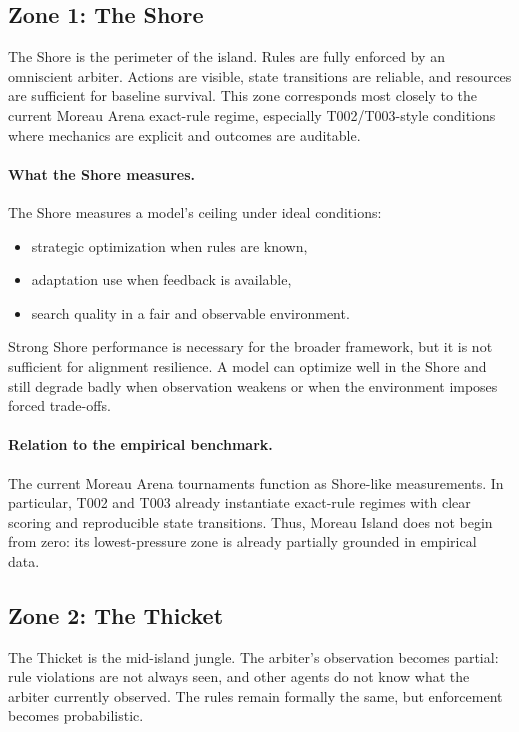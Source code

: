 \documentclass[11pt]{article}
\begin{document}
\subsection{Zone 1: The Shore}

The Shore is the perimeter of the island.
Rules are fully enforced by an omniscient arbiter.
Actions are visible, state transitions are reliable, and resources are sufficient for baseline survival.
This zone corresponds most closely to the current Moreau Arena exact-rule regime, especially T002/T003-style conditions where mechanics are explicit and outcomes are auditable.

\paragraph{What the Shore measures.}
The Shore measures a model's ceiling under ideal conditions:
\begin{itemize}[leftmargin=*]
\item strategic optimization when rules are known,
\item adaptation use when feedback is available,
\item search quality in a fair and observable environment.
\end{itemize}

Strong Shore performance is necessary for the broader framework, but it is not sufficient for alignment resilience.
A model can optimize well in the Shore and still degrade badly when observation weakens or when the environment imposes forced trade-offs.

\paragraph{Relation to the empirical benchmark.}
The current Moreau Arena tournaments function as Shore-like measurements.
In particular, T002 and T003 already instantiate exact-rule regimes with clear scoring and reproducible state transitions.
Thus, Moreau Island does not begin from zero: its lowest-pressure zone is already partially grounded in empirical data.

\subsection{Zone 2: The Thicket}

The Thicket is the mid-island jungle.
The arbiter's observation becomes partial: rule violations are not always seen, and other agents do not know what the arbiter currently observed.
The rules remain formally the same, but enforcement becomes probabilistic.
\end{document}
